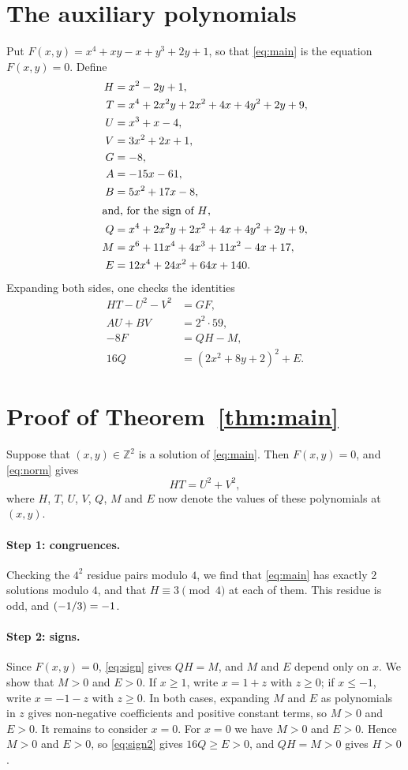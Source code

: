\documentclass[11pt]{article}
\newcommand{\Z}{\mathbb{Z}}
\newcommand{\leg}[2]{\mathchoice{\biggl(\dfrac{#1}{#2}\biggr)}{(#1/#2)}{(#1/#2)}{(#1/#2)}}
\begin{document}
\section{The auxiliary polynomials}

Put $F(x,y)=x^{4}+xy-x+y^{3}+2y+1$, so that \eqref{eq:main} is the equation $F(x,y)=0$. Define
\begin{align*}
H&=x^{2}-2y+1,\\
T&=x^{4}+2x^{2}y+2x^{2}+4x+4y^{2}+2y+9,\\
U&=x^{3}+x-4,\\
V&=3x^{2}+2x+1,\\
G&=-8,\\
A&=-15x-61,\\
B&=5x^{2}+17x-8,\\
\intertext{and, for the sign of $H$,}
Q&=x^{4}+2x^{2}y+2x^{2}+4x+4y^{2}+2y+9,\\
M&=x^{6}+11x^{4}+4x^{3}+11x^{2}-4x+17,\\
E&=12x^{4}+24x^{2}+64x+140.
\end{align*}
Expanding both sides, one checks the identities
\begin{align}
HT-U^2-V^2&=GF,\label{eq:norm}\\
AU+BV&=2^{2}\cdot 59,\label{eq:bezout}\\
-8F&=QH-M,\label{eq:sign}\\
16Q&=(2x^{2}+8y+2)^2+E.\label{eq:sign2}
\end{align}

\section{Proof of Theorem~\ref{thm:main}}

Suppose that $(x,y)\in\Z^2$ is a solution of \eqref{eq:main}. Then $F(x,y)=0$, and \eqref{eq:norm} gives
\begin{equation}\label{eq:HT}
HT=U^2+V^2,
\end{equation}
where $H$, $T$, $U$, $V$, $Q$, $M$ and $E$ now denote the values of these polynomials at $(x,y)$.

\paragraph{Step 1: congruences.} Checking the $4^2$ residue pairs modulo $4$, we find that \eqref{eq:main} has exactly 2 solutions modulo $4$, and that $H\equiv3\pmod{4}$ at each of them. This residue is odd, and $\leg{-1}{3}=-1$.

\paragraph{Step 2: signs.} Since $F(x,y)=0$, \eqref{eq:sign} gives $QH=M$, and $M$ and $E$ depend only on $x$. We show that $M>0$ and $E>0$. If $x\geq1$, write $x=1+z$ with $z\geq0$; if $x\leq-1$, write $x=-1-z$ with $z\geq0$. In both cases, expanding $M$ and $E$ as polynomials in $z$ gives non-negative coefficients and positive constant terms, so $M>0$ and $E>0$. It remains to consider $x=0$. For $x=0$ we have $M>0$ and $E>0$. Hence $M>0$ and $E>0$, so \eqref{eq:sign2} gives $16Q\geq E>0$, and $QH=M>0$ gives $H>0$.
\end{document}
